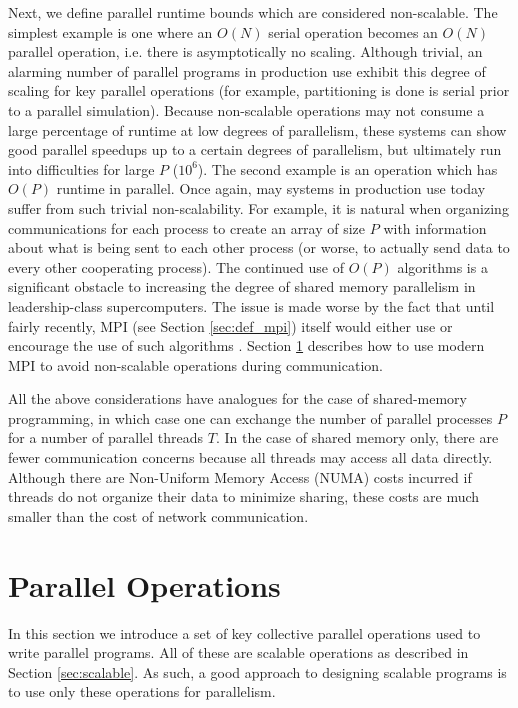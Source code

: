 Next, we define parallel runtime bounds which are considered non-scalable.
The simplest example is one where an $O(N)$ serial operation becomes
an $O(N)$ parallel operation, i.e. there is asymptotically no scaling.
Although trivial, an alarming number of parallel programs in production
use exhibit this degree of scaling for key parallel operations
(for example, partitioning is done is serial prior to a parallel simulation).
Because non-scalable operations may not consume a large percentage
of runtime at low degrees of parallelism,
these systems can show good parallel speedups up to a certain degrees of parallelism,
but ultimately run into difficulties for large $P$ ($10^6$).
The second example is an operation which has $O(P)$ runtime in parallel.
Once again, may systems in production use today suffer from such
trivial non-scalability.
For example, it is natural when organizing communications for each process to create
an array of size $P$ with information about what is being sent to each
other process (or worse, to actually send data to every other cooperating process).
The continued use of $O(P)$ algorithms is a significant obstacle to
increasing the degree of shared memory parallelism in leadership-class supercomputers.
The issue is made worse by the fact that until fairly recently,
MPI (see Section \ref{sec:def_mpi}) itself would either use
or encourage the use of such algorithms \cite{balaji2009mpi}.
Section \ref{sec:paraops} describes how to use modern MPI
to avoid non-scalable operations during communication.

All the above considerations have analogues for the case of shared-memory programming,
in which case one can exchange the number of parallel processes $P$ for a number
of parallel threads $T$.
In the case of shared memory only, there are fewer communication concerns because
all threads may access all data directly.
Although there are Non-Uniform Memory Access (NUMA) costs incurred if threads do
not organize their data to minimize sharing, these costs are much smaller than
the cost of network communication.

\section{Parallel Operations}
\label{sec:paraops}

In this section we introduce a set of key collective parallel operations
used to write parallel programs.
All of these are scalable operations as described in Section \ref{sec:scalable}.
As such, a good approach to designing scalable programs is to use
only these operations for parallelism.


